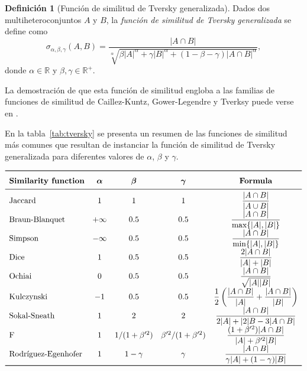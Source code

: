 \documentclass[a4paper,10pt,twoside]{article}
\theoremstyle{definition}
\newtheorem{definition}{Definición}
\begin{document}
\begin{definition}[Función de similitud de Tversky generalizada]
Dados dos multiheteroconjuntos $A$ y $B$, la \emph{función de similitud de Tversky generalizada} se define como
\[
\sigma_{\alpha,\beta,\gamma} (A,B) = \frac{|A\cap
B|}{\sqrt[\alpha]{\beta|A|^\alpha+\gamma|B|^\alpha+(1-\beta-\gamma)|A\cap B|^\alpha}},
\]
donde $\alpha\in \mathbb{R}$ y  $\beta,\gamma\in \mathbb{R}^+$.
\end{definition}

La demostración de que esta función de similitud engloba a las familias de funciones de similitud de Caillez-Kuntz, Gower-Legendre y Tverksy puede verse en \cite{sanchezalberca2015modelado}.

En la tabla~\ref{tab:tversky} se presenta un resumen de las funciones de similitud más comunes que resultan de instanciar la función de similitud de Tversky generalizada para diferentes valores de $\alpha$, $\beta$ y $\gamma$.

\begin{table}[htbp!]
\caption{Funciones de similitud para multiheteroconjuntos derivadas de la de Tversky.\label{tab:tversky}}
\[
\renewcommand*{\arraystretch}{1.5}
\begin{array}{lcccc}
\toprule
\text{\bf Similarity function} & \mbox{\boldmath$\alpha$} & \mbox{\boldmath$\beta$} & \mbox{\boldmath$\gamma$} &
\text{\bf Formula}\\
\midrule
\text{Jaccard} & 1 & 1 & 1 & \dfrac{|A\cap B|}{|A\cup B|}\\
\text{Braun-Blanquet} &+\infty & 0.5 & 0.5 & \dfrac{|A\cap B|}{\max\{|A|,|B|\}}\\
\text{Simpson} & -\infty & 0.5 & 0.5 & \dfrac{|A\cap B|}{\min\{|A|,|B|\}}\\
\text{Dice} & 1 & 0.5 & 0.5 & \dfrac{2|A\cap B|}{|A|+|B|}\\
\text{Ochiai} & 0 & 0.5 & 0.5 & \dfrac{|A\cap B|}{\sqrt{|A||B|}}\\
\text{Kulczynski} & -1 & 0.5 & 0.5 & \dfrac{1}{2}\left(\dfrac{|A\cap B|}{|A|}+\dfrac{|A\cap B|}{|B|} \right)\\
\text{Sokal-Sneath} & 1 & 2 & 2 & \dfrac{|A\cap B|}{2|A|+|2|B-3|A\cap B|}\\
\text{F} & 1 & 1/(1+\beta'^2) & \beta'^2/(1+\beta'^2) & \dfrac{(1+\beta'^2)|A\cap B|}{|A|+\beta'^2|B|}\\
\text{Rodríguez-Egenhofer} & 1 & 1-\gamma & \gamma & \dfrac{|A\cap B|}{\gamma |A|+(1-\gamma)|B|}\\
\bottomrule
\end{array}
\]
\end{table}
\end{document}
